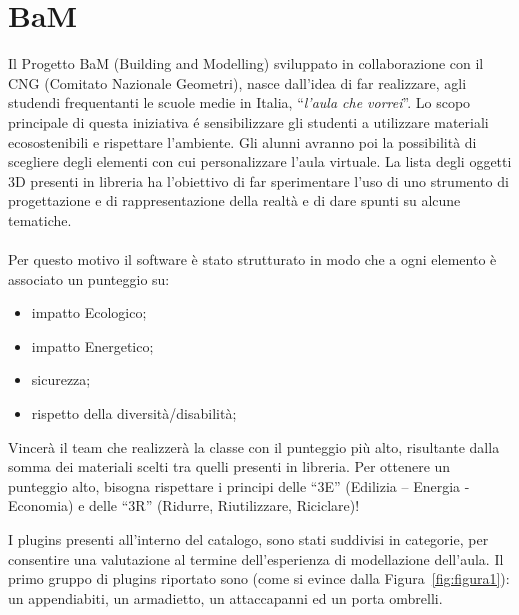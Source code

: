 \section{BaM}
\label{sec:chapter_4_section_1}
Il Progetto BaM (Building and Modelling) sviluppato in collaborazione con il CNG (Comitato Nazionale Geometri),
nasce dall'idea di far realizzare, agli studendi frequentanti le scuole medie in Italia,
``\emph{l'aula che vorrei}''. Lo scopo principale di questa iniziativa \'e sensibilizzare gli studenti a utilizzare
materiali ecosostenibili e rispettare l'ambiente.
Gli alunni avranno poi la possibilità di scegliere degli elementi con cui personalizzare l’aula virtuale.
La lista degli oggetti 3D presenti in libreria ha l’obiettivo di far sperimentare l’uso di uno strumento di progettazione
e di rappresentazione della realtà e di dare spunti su alcune tematiche.\\
\\Per questo motivo il software è stato strutturato in modo che a ogni elemento è associato un punteggio su:
\begin{itemize}
\item impatto Ecologico;
\item impatto Energetico;
\item sicurezza;
\item rispetto della diversità/disabilità;
\end{itemize}
Vincerà il team che realizzerà la classe con il punteggio più alto, risultante dalla somma dei materiali scelti
tra quelli presenti in libreria. Per ottenere un punteggio alto, bisogna rispettare i principi delle
“3E” (Edilizia – Energia - Economia) e delle “3R” (Ridurre, Riutilizzare, Riciclare)!
\newpage

I plugins presenti all'interno del catalogo, sono stati suddivisi in categorie, per consentire una valutazione al
termine dell'esperienza di modellazione dell'aula.
Il primo gruppo di plugins riportato sono (come si evince dalla Figura~\ref{fig:figura1}): un appendiabiti, un armadietto,
un attaccapanni ed un porta ombrelli.\\

